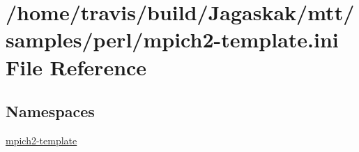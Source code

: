 \hypertarget{mpich2-template_8ini}{\section{/home/travis/build/\-Jagaskak/mtt/samples/perl/mpich2-\/template.ini File Reference}
\label{mpich2-template_8ini}
}
\subsection*{Namespaces}
\begin{DoxyCompactItemize}
\item 
\hyperlink{namespacempich2-template}{mpich2-\/template}
\end{DoxyCompactItemize}

